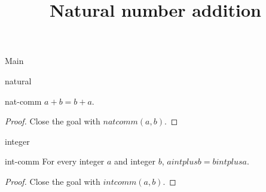 \begin{lexlean}{Main}
\title{Natural number addition}

\begin{section}{natural}
  \begin{theorem}{nat-comm}
  \noaxioms
  \(a + b = b + a\).
  \begin{proof}
  Close the goal with \(natcomm(a, b)\).
  \end{proof}
  \end{theorem}
\end{section}

\begin{section}{integer}
  \begin{theorem}{int-comm}
  For every integer \(a\) and integer \(b\), \(a intplus b = b intplus a\).
  \begin{proof}
  Close the goal with \(intcomm(a, b)\).
  \end{proof}
  \end{theorem}
\end{section}
\end{lexlean}
